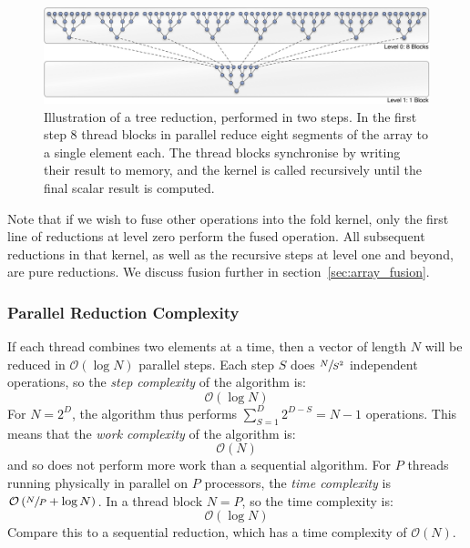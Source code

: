 \begin{figure}
    \begin{center}
        \includegraphics[width=\textwidth]{images/sec-4/tree-reduction}
    \end{center}
    \caption[A parallel tree reduction]{Illustration of a tree reduction,
        performed in two steps. In the first step 8 thread blocks in parallel
        reduce eight segments of the array to a single element each. The thread
        blocks synchronise by writing their result to memory, and the kernel is
        called recursively until the final scalar result is computed.}
    \label{fig:tree_reduction}
\end{figure}

Note that if we wish to fuse other operations into the fold kernel, only the
first line of reductions at level zero perform the fused operation. All
subsequent reductions in that kernel, as well as the recursive steps at level
one and beyond, are pure reductions. We discuss fusion further in
section~\ref{sec:array_fusion}.

\subsubsection{Parallel Reduction Complexity}
\label{sec:parallel_reduction_complexity}

If each thread combines two elements at a time, then a vector of length $N$ will
be reduced in $\mathcal{O}\left( \log N \right)$ parallel steps. Each step $S$
does $\sfrac{N}{S^2}$ independent operations, so the \emph{step
complexity} of the algorithm is:
\[
\mathcal{O}\left( \log N \right)
\]
For $N=2^{D}$, the algorithm thus performs $\sum_{S=1}^{D}2^{D-S} = N - 1$
operations. This means that the \emph{work complexity} of
the algorithm is:
\[
\mathcal{O}\left( N \right)
\]
and so does not perform more work than a sequential algorithm. For $P$ threads
running physically in parallel on $P$ processors, the \emph{time
complexity} is $\mathcal{O}\left( \sfrac{N}{P} + \log N
\right)$. In a thread block $N = P$, so the time complexity is:
\[
\mathcal{O}\left( \log N \right)
\]
Compare this to a sequential reduction, which has a time complexity of
$\mathcal{O}\left( N \right)$.

